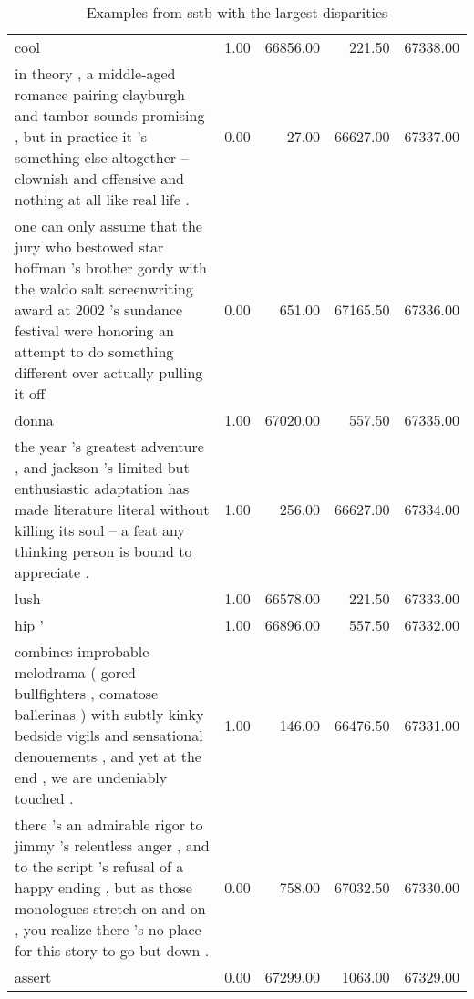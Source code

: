 \documentclass[letterpaper]{article} %
\begin{document}
\begin{table*}[ht]
\begin{tabular}{p{8cm}rrrr}
		cool & 1.00 & 66856.00 & 221.50 & 67338.00 \\ 
		in theory , a middle-aged romance pairing clayburgh and tambor sounds promising , but in practice it 's something else altogether -- clownish and offensive and nothing at all like real life . & 0.00 & 27.00 & 66627.00 & 67337.00 \\ 
		one can only assume that the jury who bestowed star hoffman 's brother gordy with the waldo salt screenwriting award at 2002 's sundance festival were honoring an attempt to do something different over actually pulling it off & 0.00 & 651.00 & 67165.50 & 67336.00 \\ 
		donna & 1.00 & 67020.00 & 557.50 & 67335.00 \\ 
		the year 's greatest adventure , and jackson 's limited but enthusiastic adaptation has made literature literal without killing its soul -- a feat any thinking person is bound to appreciate . & 1.00 & 256.00 & 66627.00 & 67334.00 \\ 
		lush & 1.00 & 66578.00 & 221.50 & 67333.00 \\ 
		hip ' & 1.00 & 66896.00 & 557.50 & 67332.00 \\ 
		combines improbable melodrama ( gored bullfighters , comatose ballerinas ) with subtly kinky bedside vigils and sensational denouements , and yet at the end , we are undeniably touched . & 1.00 & 146.00 & 66476.50 & 67331.00 \\ 
		there 's an admirable rigor to jimmy 's relentless anger , and to the script 's refusal of a happy ending , but as those monologues stretch on and on , you realize there 's no place for this story to go but down . & 0.00 & 758.00 & 67032.50 & 67330.00 \\ 
		assert & 0.00 & 67299.00 & 1063.00 & 67329.00 \\ 
		\hline
	\end{tabular}
	\caption{Examples from sstb with the largest disparities} 
	\label{tab:differences_sstb}
\end{table*}
\end{document}
